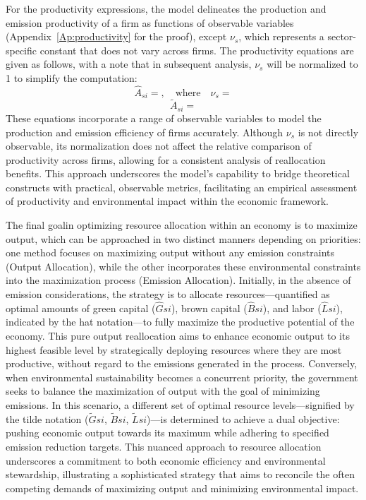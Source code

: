 For the productivity expressions, the model delineates the production and emission productivity of a firm as functions of observable variables (Appendix~\ref{Ap:productivity} for the proof), except $\nu_s$, which represents a sector-specific constant that does not vary across firms. The productivity equations are given as follows, with a note that in subsequent analysis, $\nu_s$ will be normalized to 1 to simplify the computation:
\begin{equation}\label{eq:productivity}
  \hat{A}_{si} = , \quad \text{where} \quad \nu_s = 
\end{equation}
\begin{equation}\label{eq:emission_productivity}
  \tilde{A}_{si} = 
\end{equation}
These equations incorporate a range of observable variables to model the production and emission efficiency of firms accurately. Although $\nu_s$ is not directly observable, its normalization does not affect the relative comparison of productivity across firms, allowing for a consistent analysis of reallocation benefits. This approach underscores the model's capability to bridge theoretical constructs with practical, observable metrics, facilitating an empirical assessment of productivity and environmental impact within the economic framework.

The final goalin optimizing resource allocation within an economy is to maximize output, which can be approached in two distinct manners depending on priorities: one method focuses on maximizing output without any emission constraints (Output Allocation), while the other incorporates these environmental constraints into the maximization process (Emission Allocation). Initially, in the absence of emission considerations, the strategy is to allocate resources—quantified as optimal amounts of green capital ($\hat{G}{si}$), brown capital ($\hat{B}{si}$), and labor ($\hat{L}{si}$), indicated by the hat notation—to fully maximize the productive potential of the economy. This pure output reallocation aims to enhance economic output to its highest feasible level by strategically deploying resources where they are most productive, without regard to the emissions generated in the process. Conversely, when environmental sustainability becomes a concurrent priority, the government seeks to balance the maximization of output with the goal of minimizing emissions. In this scenario, a different set of optimal resource levels—signified by the tilde notation ($\tilde{G}{si}$, $\tilde{B}{si}$, $\tilde{L}{si}$)—is determined to achieve a dual objective: pushing economic output towards its maximum while adhering to specified emission reduction targets. This nuanced approach to resource allocation underscores a commitment to both economic efficiency and environmental stewardship, illustrating a sophisticated strategy that aims to reconcile the often competing demands of maximizing output and minimizing environmental impact.

